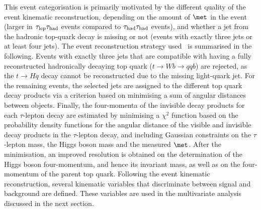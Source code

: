 This event categorisation is primarily motivated by the different quality of the event kinematic reconstruction, depending on the amount 
of $\met$ in the event (larger in $\tau_{\mathrm{lep}} \tau_{\mathrm{had}}$ events compared to $\tau_{\mathrm{had}} \tau_{\mathrm{had}}$ events), and whether a jet from the hadronic top-quark decay 
is missing or not (events with exactly three jets or at least four jets).
The event reconstruction strategy used~\cite{Chen:2015nta} is summarised in the following.
Events with exactly three jets that are compatible with having a fully reconstructed hadronically decaying 
top quark ($t \to Wb \to qqb$) are rejected, as the $t \to Hq$ decay cannot be reconstructed due to the missing light-quark jet.
For the remaining events, the selected jets are assigned to the different top quark decay products via a criterion based on 
minimising a sum of angular distances between objects. Finally, the four-momenta of the invisible decay products for each $\tau$-lepton decay 
are estimated by minimising a $\chi^2$ function based on the probability density functions for the angular distance of the visible and invisible
decay products in the $\tau$-lepton decay, and including Gaussian constraints on the $\tau$-lepton mass, the Higgs boson mass and the
measured $\met$. After the minimisation, an improved resolution is obtained on the determination of the Higgs boson four-momentum, and hence
its invariant mass, as well as on the four-momentum of the parent top quark. Following the event kinematic reconstruction, several kinematic variables
that discriminate between signal and background are defined. These variables are used in the multivariate analysis discussed in the next section.

